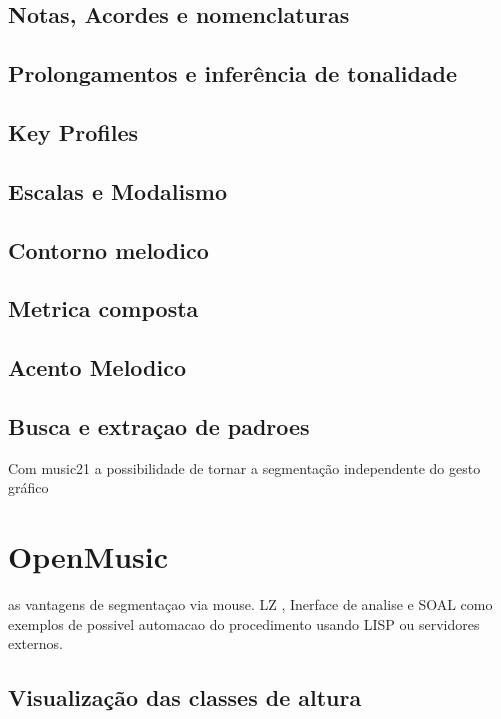 \documentclass[
	12pt,				%
	openright,			%
	twoside,			%
	a4paper,			%
	english,			%
	french,				%
	spanish,			%
	brazil				%
	]{abntex2}
\begin{document}
\subsection{Notas, Acordes e nomenclaturas}


\subsection{Prolongamentos e inferência de tonalidade}

\subsection{Key Profiles}

\subsection{Escalas e Modalismo}

\subsection{Contorno melodico}

\subsection{Metrica composta}

\subsection{Acento Melodico}

\subsection{Busca e extraçao de padroes}

Com music21 a possibilidade de tornar a segmentação independente do gesto gráfico

\section{OpenMusic}

as vantagens de segmentaçao via mouse. LZ , Inerface de analise e SOAL como exemplos de possivel automacao do procedimento usando LISP ou servidores externos.

\subsection{Visualização das classes de altura}
\end{document}
